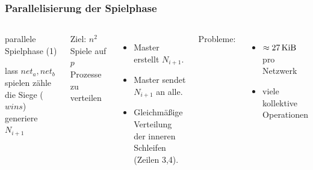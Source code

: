 \begin{frame}
    \frametitle{Parallelisierung der Spielphase}

    \begin{columns}[t]
        \vspace{-0.7cm}
        \begin{algorithm}[H]
            \caption{parallele Spielphase (1)}
            \begin{algorithmic}[1]
                            \State lass $net_a, net_b$ spielen
                            \State zähle die Siege ($wins$)
                        \EndParDo
                    \EndParDo
                    \State {}
                        generiere $N_{i+1}$
                    \EndIIf
                    \State {}
                \EndFor
            \end{algorithmic}
        \end{algorithm}
        \hfill

        Ziel: $n^2$ Spiele auf $p$ Prozesse zu verteilen
        \begin{itemize}
            \item Master erstellt $N_{i+1}$.
            \item Master sendet $N_{i+1}$ an alle.
            \item Gleichmäßige Verteilung der inneren Schleifen (Zeilen 3,4).
        \end{itemize}
        Probleme:
        \begin{itemize}
            \item $\approx \SI{27}{\kibi\byte}$ pro Netzwerk
            \item viele kollektive Operationen
        \end{itemize}
    \end{columns}
\end{frame}

